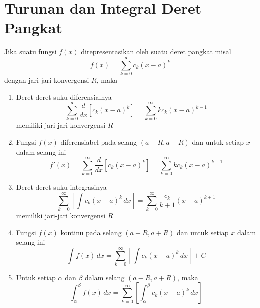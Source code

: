 \documentclass{article}
\begin{document}
\section{Turunan dan Integral Deret Pangkat}
Jika suatu fungsi $f(x)$ direpresentasikan oleh suatu deret pangkat misal
$$ f(x) = \sum_{k=0}^\infty c_k(x-a)^k $$
dengan jari-jari konvergensi $R$, maka 
\begin{enumerate}
	\item Deret-deret suku diferensialnya 
	$$ \sum_{k=0}^\infty \dfrac{d}{dx} [c_k(x-a)^k] = \sum_{k=0}^\infty kc_k (x-a)^{k-1} $$
	memiliki jari-jari konvergensi $R$
	\item Fungsi $f(x)$ diferensiabel pada selang $(a-R,a+R)$ dan untuk setiap $x$ dalam selang ini 
	$$ f'(x) = \sum_{k=0}^\infty \dfrac{d}{dx} [c_k(x-a)^k] = \sum_{k=0}^\infty kc_k(x-a)^{k-1} $$
	\item Deret-deret suku integrasinya 
	$$ \sum_{k=0}^\infty \left[\int c_k(x-a)^k \, dx\right] = \sum_{k=0}^\infty \dfrac{c_k}{k+1} (x-a)^{k+1} $$
	memiliki jari-jari konvergensi $R$
	\item Fungsi $f(x)$ kontinu pada selang $(a-R,a+R)$ dan untuk setiap $x$ dalam selang ini
	$$ \int f(x)\, dx = \sum_{k=0}^\infty \left[\int c_k(x-a)^k \, dx\right] +C $$
	\item Untuk setiap $\alpha$ dan $\beta$ dalam selang $(a-R,a+R)$, maka
	$$ \int_\alpha^\beta f(x)\, dx = \sum_{k=0}^\infty \left[\int_\alpha^\beta c_k(x-a)^k \, dx\right]$$ 
\end{enumerate}
\end{document}
